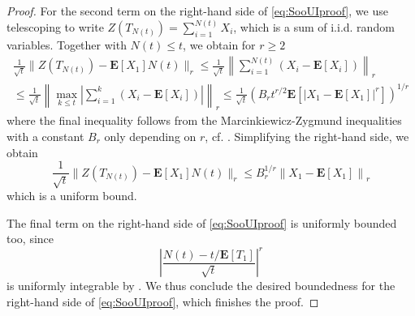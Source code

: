 \documentclass[a4paper,11pt,reqno]{amsart}
\newcommand{\bE}{\mathbf{E}}
\theoremstyle{definition}
\begin{document}
\begin{proof}
 For the second term on the right-hand side of \eqref{eq:SooUIproof}, we use telescoping to write $Z(T_{N(t)})=\sum_{i=1}^{N(t)}X_i$, which is a sum of i.i.d. random variables. Together with $N(t)\leq t$, we obtain for $r\geq2$
 \begin{multline*}
  \frac{1}{\sqrt{t}} \Big\| Z(T_{N(t)}) - \bE[X_1]N(t) \Big\|_r 
  \leq \frac{1}{\sqrt{t}} \left\| \sum_{i=1}^{N(t)} (X_i - \bE[X_i]) \right\|_r \\
  \leq \frac{1}{\sqrt{t}} \left\| \max_{k\leq t} \left|\sum_{i=1}^k (X_i-\bE[X_i]) \right|\right\|_r
  \leq \frac{1}{\sqrt{t}} \left( B_r t^{r/2} \bE\left[\big|X_1-\bE[X_1]\big|^r \right] \right)^{1/r}
 \end{multline*}
 where the final inequality follows from the Marcinkiewicz-Zygmund inequalities with a constant $B_r$ only depending on $r$, cf. \cite[Corollary~3.8.2]{Gut13}. Simplifying the right-hand side, we obtain
 \[
  \frac{1}{\sqrt{t}} \Big\| Z(T_{N(t)}) - \bE[X_1]N(t) \Big\|_r 
  \leq B_r^{1/r} \left\| X_1 - \bE[X_1] \right\|_r
 \]
 which is a uniform bound. 
 
 The final term on the right-hand side of \eqref{eq:SooUIproof} is uniformly bounded too, since  
 \[
  \left|\frac{N(t)-t/\bE[T_1]}{\sqrt{t}}\right|^r
 \]
 is uniformly integrable by \cite[Theorem 1]{CHL79}. We thus conclude the desired boundedness for the right-hand side of \eqref{eq:SooUIproof}, which finishes the proof.
\end{proof}
\end{document}
